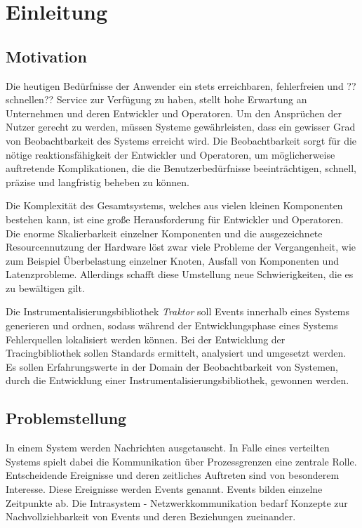%

\chapter{Einleitung}
\label{chapter:Einleitung}


\section{Motivation}
\label{section:Motivation}
	Die heutigen Bedürfnisse der Anwender ein stets erreichbaren, fehlerfreien und ??schnellen?? Service zur Verfügung zu haben, stellt hohe Erwartung an Unternehmen und deren Entwickler und Operatoren. Um den Ansprüchen der Nutzer gerecht zu werden, müssen Systeme gewährleisten, dass ein gewisser Grad von Beobachtbarkeit des Systems erreicht wird. Die Beobachtbarkeit sorgt für die nötige reaktionsfähigkeit der Entwickler und Operatoren, um möglicherweise auftretende Komplikationen, die die  Benutzerbedürfnisse beeinträchtigen, schnell, präzise und langfristig beheben zu können.
	
	Die Komplexität des Gesamtsystems, welches aus vielen kleinen Komponenten bestehen kann, ist eine große Herausforderung für Entwickler und Operatoren. Die enorme Skalierbarkeit einzelner Komponenten und die ausgezeichnete Resourcennutzung der Hardware löst zwar viele Probleme der Vergangenheit, wie zum Beispiel Überbelastung einzelner Knoten, Ausfall von Komponenten und Latenzprobleme. Allerdings schafft diese Umstellung neue Schwierigkeiten, die es zu bewältigen gilt. 
	
	Die Instrumentalisierungsbibliothek \emph{Traktor} soll Events innerhalb eines Systems generieren und ordnen, sodass während der Entwicklungsphase eines Systems Fehlerquellen lokalisiert werden können. Bei der Entwicklung der Tracingbibliothek sollen Standards ermittelt, analysiert und umgesetzt werden. Es sollen Erfahrungswerte in der Domain der Beobachtbarkeit von Systemen, durch die Entwicklung einer Instrumentalisierungsbibliothek, gewonnen werden.
	
\section{Problemstellung}
\label{section:Problemstellung}
	In einem System werden Nachrichten ausgetauscht. In Falle eines verteilten Systems spielt dabei die Kommunikation über Prozessgrenzen eine zentrale Rolle.
	Entscheidende Ereignisse und deren zeitliches Auftreten sind von besonderem Interesse. Diese Ereignisse werden Events genannt. Events bilden einzelne Zeitpunkte ab. Die Intrasystem - Netzwerkkommunikation bedarf Konzepte zur Nachvollziehbarkeit von Events und deren Beziehungen zueinander. 
	
